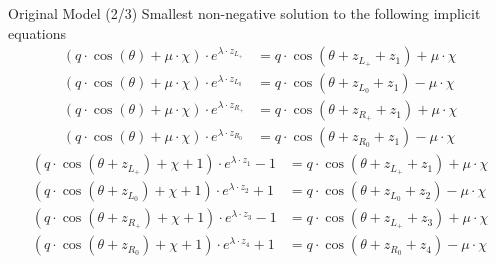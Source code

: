 \begin{frame}{Original Model (2/3)}
    Smallest non-negative solution to the following implicit equations
    \begin{subequations}
        \begin{align}
            (q \cdot \cos(\theta) + \mu \cdot \chi) \cdot e^{\lambda \cdot z_{L_+}}
             & = q \cdot \cos(\theta + z_{L_+} + z_1) + \mu \cdot \chi \\
            (q \cdot \cos(\theta) + \mu \cdot \chi) \cdot e^{\lambda \cdot z_{L_0}}
             & = q \cdot \cos(\theta + z_{L_0} + z_1) - \mu \cdot \chi \\
            (q \cdot \cos(\theta) + \mu \cdot \chi) \cdot e^{\lambda \cdot z_{R_+}}
             & = q \cdot \cos(\theta + z_{R_+} + z_1) + \mu \cdot \chi \\
            (q \cdot \cos(\theta) + \mu \cdot \chi) \cdot e^{\lambda \cdot z_{R_0}}
             & = q \cdot \cos(\theta + z_{R_0} + z_1) - \mu \cdot \chi
        \end{align}
    \end{subequations}
    \vspace{-2em}
    \begin{subequations}
        \begin{align}
            (q \cdot \cos(\theta + z_{L_+}) + \chi + 1) \cdot e^{\lambda \cdot z_1} - 1
             & = q \cdot  \cos(\theta + z_{L_+} + z_1) + \mu \cdot \chi \\
            (q \cdot \cos(\theta + z_{L_0}) + \chi + 1) \cdot e^{\lambda \cdot z_2} + 1
             & = q \cdot  \cos(\theta + z_{L_0} + z_2) - \mu \cdot \chi \\
            (q \cdot \cos(\theta + z_{R_+}) + \chi + 1) \cdot e^{\lambda \cdot z_3} - 1
             & = q \cdot  \cos(\theta + z_{L_+} + z_3) + \mu \cdot \chi \\
            (q \cdot \cos(\theta + z_{R_0}) + \chi + 1) \cdot e^{\lambda \cdot z_4} + 1
             & = q \cdot  \cos(\theta + z_{R_0} + z_4) - \mu \cdot \chi
        \end{align}
    \end{subequations}
\end{frame}

